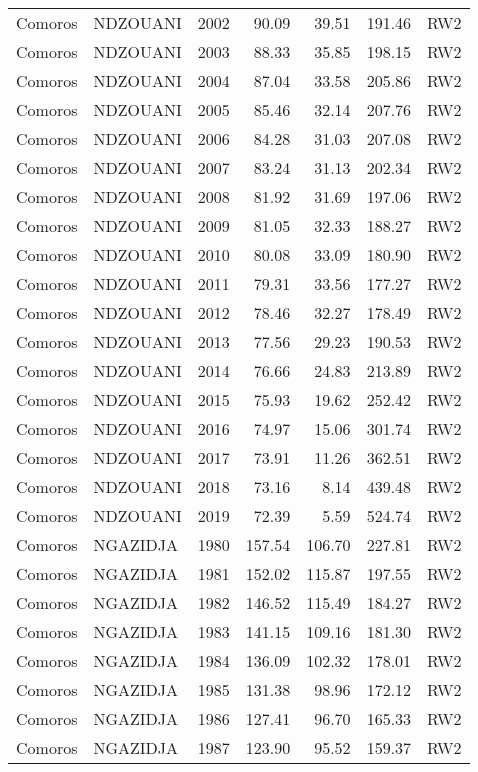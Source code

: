 \begin{longtable}{lllrrrl}
  Comoros & NDZOUANI & 2002 & 90.09 & 39.51 & 191.46 & RW2 \\ 
  Comoros & NDZOUANI & 2003 & 88.33 & 35.85 & 198.15 & RW2 \\ 
  Comoros & NDZOUANI & 2004 & 87.04 & 33.58 & 205.86 & RW2 \\ 
  Comoros & NDZOUANI & 2005 & 85.46 & 32.14 & 207.76 & RW2 \\ 
  Comoros & NDZOUANI & 2006 & 84.28 & 31.03 & 207.08 & RW2 \\ 
  Comoros & NDZOUANI & 2007 & 83.24 & 31.13 & 202.34 & RW2 \\ 
  Comoros & NDZOUANI & 2008 & 81.92 & 31.69 & 197.06 & RW2 \\ 
  Comoros & NDZOUANI & 2009 & 81.05 & 32.33 & 188.27 & RW2 \\ 
  Comoros & NDZOUANI & 2010 & 80.08 & 33.09 & 180.90 & RW2 \\ 
  Comoros & NDZOUANI & 2011 & 79.31 & 33.56 & 177.27 & RW2 \\ 
  Comoros & NDZOUANI & 2012 & 78.46 & 32.27 & 178.49 & RW2 \\ 
  Comoros & NDZOUANI & 2013 & 77.56 & 29.23 & 190.53 & RW2 \\ 
  Comoros & NDZOUANI & 2014 & 76.66 & 24.83 & 213.89 & RW2 \\ 
  Comoros & NDZOUANI & 2015 & 75.93 & 19.62 & 252.42 & RW2 \\ 
  Comoros & NDZOUANI & 2016 & 74.97 & 15.06 & 301.74 & RW2 \\ 
  Comoros & NDZOUANI & 2017 & 73.91 & 11.26 & 362.51 & RW2 \\ 
  Comoros & NDZOUANI & 2018 & 73.16 & 8.14 & 439.48 & RW2 \\ 
  Comoros & NDZOUANI & 2019 & 72.39 & 5.59 & 524.74 & RW2 \\ 
  Comoros & NGAZIDJA & 1980 & 157.54 & 106.70 & 227.81 & RW2 \\ 
  Comoros & NGAZIDJA & 1981 & 152.02 & 115.87 & 197.55 & RW2 \\ 
  Comoros & NGAZIDJA & 1982 & 146.52 & 115.49 & 184.27 & RW2 \\ 
  Comoros & NGAZIDJA & 1983 & 141.15 & 109.16 & 181.30 & RW2 \\ 
  Comoros & NGAZIDJA & 1984 & 136.09 & 102.32 & 178.01 & RW2 \\ 
  Comoros & NGAZIDJA & 1985 & 131.38 & 98.96 & 172.12 & RW2 \\ 
  Comoros & NGAZIDJA & 1986 & 127.41 & 96.70 & 165.33 & RW2 \\ 
  Comoros & NGAZIDJA & 1987 & 123.90 & 95.52 & 159.37 & RW2 \\ 

\end{longtable}
